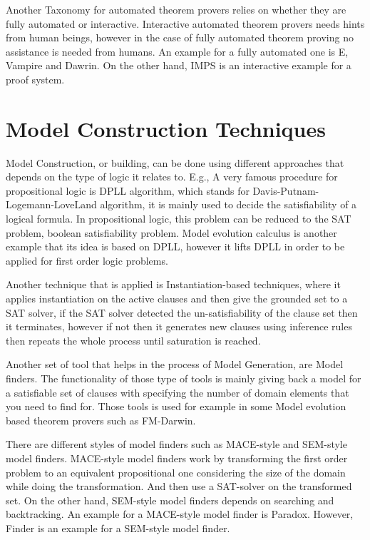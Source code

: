 Another Taxonomy for automated theorem provers relies on whether they are fully automated or interactive. Interactive automated theorem provers needs hints from human beings, however in the case of fully automated theorem proving no assistance is needed from humans. An example for a fully automated one is E, Vampire and Dawrin. On the other hand, IMPS \cite{IMPS} is an interactive example for a proof system.


\section{Model Construction Techniques}
Model Construction, or building, can be done using different approaches that depends on the type of logic it relates to. E.g., A very famous procedure for propositional logic is DPLL algorithm, which stands for Davis-Putnam-Logemann-LoveLand algorithm, it is mainly used to decide the satisfiability of a logical formula. In propositional logic, this problem can be reduced to the SAT problem, boolean satisfiability problem. Model evolution calculus is another example that its idea is based on DPLL, however it lifts DPLL in order to be applied for first order logic problems.


Another technique that is applied is Instantiation-based techniques, where it applies instantiation on the active clauses and then give the grounded set to a SAT solver, if the SAT solver detected the un-satisfiability of the clause set then it terminates, however if not then it generates new clauses using inference rules then repeats the whole process until saturation is reached.


Another set of tool that helps in the process of Model Generation, are Model finders. The functionality of those type of tools is mainly giving back a model for a satisfiable set of clauses with specifying the number of domain elements that you need to find for. Those tools is used for example in some Model evolution based theorem provers such as FM-Darwin.


There are different styles of model finders such as MACE-style and SEM-style model finders. MACE-style model finders work by transforming the first order problem to an equivalent propositional one considering the size of the domain while doing the transformation. And then use a SAT-solver on the transformed set. On the other hand, SEM-style model finders depends on searching and backtracking. An example for a MACE-style model finder is Paradox. However, Finder is an example for a SEM-style model finder. \cite{MODEL_FINDER}      


